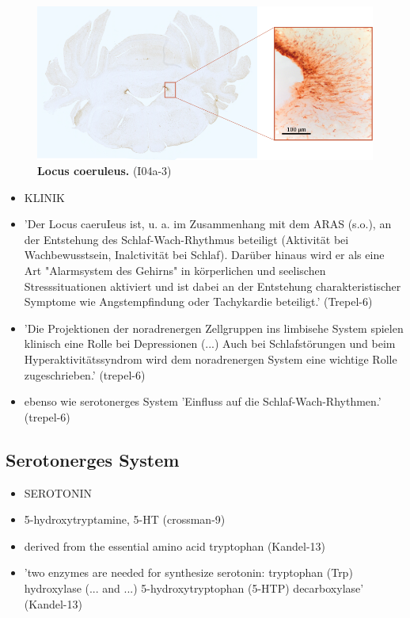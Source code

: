 \documentclass[12pt,a4paper,pdftex]{article}
\begin{document}
\begin{figure}[H]
    \centering
    \includegraphics[width=\textwidth]{pictures/Bilder_monoamine_systeme/locus_coeruleus.png}
    \caption[Locus coeruleus]{\textbf{Locus coeruleus.} (I04a-3)}
    \label{fig:locus_coeruleus}
\end{figure}{}

\begin{itemize}
    \item KLINIK
    \item 'Der Locus caeruIeus ist, u. a. im Zusammenhang mit dem ARAS (s.o.), an der Entstehung des Schlaf-Wach-Rhythmus beteiligt (Aktivität bei Wachbewusstsein, Inalctivität bei Schlaf). Darüber hinaus wird er als eine Art "Alarmsystem des Gehirns" in körperlichen und seelischen Stresssituationen aktiviert und ist dabei an der Entstehung charakteristischer Symptome wie Angstempfindung oder Tachykardie beteiligt.' (Trepel-6)
    \item 'Die Projektionen der noradrenergen Zellgruppen ins limbisehe System spielen klinisch eine Rolle bei Depressionen (...) Auch bei Schlafstörungen und beim Hyperaktivitätssyndrom wird dem noradrenergen System eine wichtige Rolle zugeschrieben.' (trepel-6)
    \item ebenso wie serotonerges System 'Einfluss auf die Schlaf-Wach-Rhythmen.' (trepel-6)
\end{itemize}


\subsection{Serotonerges System}
\label{serotonerges_system}

\begin{itemize}
    \item SEROTONIN
    \item 5-hydroxytryptamine, 5-HT (crossman-9)
    \item derived from the essential amino acid tryptophan (Kandel-13)
    \item 'two enzymes are needed for synthesize serotonin: tryptophan (Trp) hydroxylase (... and ...) 5-hydroxytryptophan (5-HTP) decarboxylase' (Kandel-13)
\end{itemize}
\end{document}
